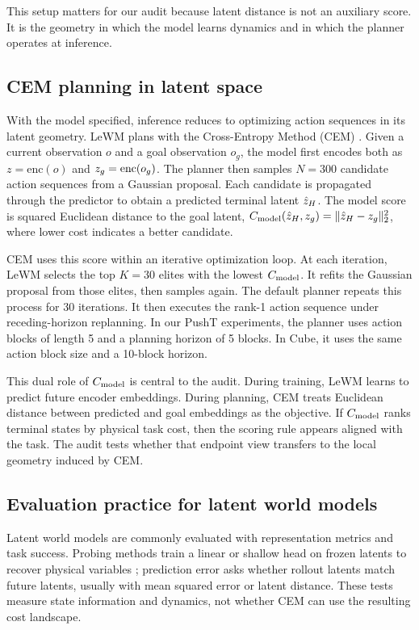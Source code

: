 This setup matters for our audit because latent distance is not an auxiliary score. It is the geometry in which the model learns dynamics and in which the planner operates at inference.

\subsection{CEM planning in latent space}

With the model specified, inference reduces to optimizing action sequences in its latent geometry. LeWM plans with the Cross-Entropy Method (CEM) \citep{cem1999}. Given a current observation $o$ and a goal observation $o_g$, the model first encodes both as $z=\mathrm{enc}(o)$ and $z_g=\mathrm{enc}(o_g)$. The planner then samples $N=300$ candidate action sequences from a Gaussian proposal. Each candidate is propagated through the predictor to obtain a predicted terminal latent $\hat{z}_H$. The model score is squared Euclidean distance to the goal latent, $C_\text{model}(\hat{z}_H,z_g)=\lVert \hat{z}_H-z_g\rVert_2^2$, where lower cost indicates a better candidate.

CEM uses this score within an iterative optimization loop. At each iteration, LeWM selects the top $K=30$ elites with the lowest $C_\text{model}$. It refits the Gaussian proposal from those elites, then samples again. The default planner repeats this process for 30 iterations. It then executes the rank-1 action sequence under receding-horizon replanning. In our PushT experiments, the planner uses action blocks of length 5 and a planning horizon of 5 blocks. In Cube, it uses the same action block size and a 10-block horizon.

This dual role of $C_\text{model}$ is central to the audit. During training, LeWM learns to predict future encoder embeddings. During planning, CEM treats Euclidean distance between predicted and goal embeddings as the objective. If $C_\text{model}$ ranks terminal states by physical task cost, then the scoring rule appears aligned with the task. The audit tests whether that endpoint view transfers to the local geometry induced by CEM.

\subsection{Evaluation practice for latent world models}

Latent world models are commonly evaluated with representation metrics and task success. Probing methods train a linear or shallow head on frozen latents to recover physical variables \citep{worldmodels2018, probing2020, lewm2025}; prediction error asks whether rollout latents match future latents, usually with mean squared error or latent distance. These tests measure state information and dynamics, not whether CEM can use the resulting cost landscape.

